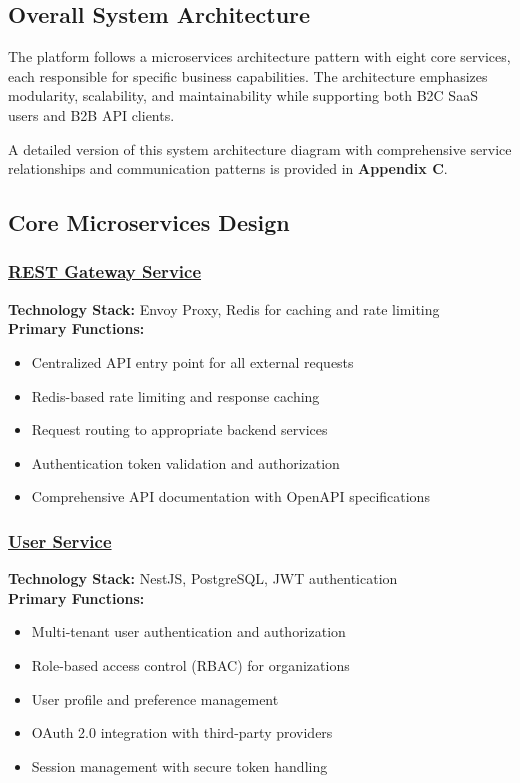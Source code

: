 \subsection{Overall System Architecture}
The platform follows a microservices architecture pattern with eight core services, each responsible for specific business capabilities. The architecture emphasizes modularity, scalability, and maintainability while supporting both B2C SaaS users and B2B API clients.

A detailed version of this system architecture diagram with comprehensive service relationships and communication patterns is provided in \textbf{Appendix C}.

\subsection{Core Microservices Design}

\subsubsection*{\underline{REST Gateway Service}}
\textbf{Technology Stack:} Envoy Proxy, Redis for caching and rate limiting\\
\textbf{Primary Functions:}
\begin{itemize}
    \item Centralized API entry point for all external requests
    \item Redis-based rate limiting and response caching
    \item Request routing to appropriate backend services
    \item Authentication token validation and authorization
    \item Comprehensive API documentation with OpenAPI specifications
\end{itemize}

\subsubsection*{\underline{User Service}}
\textbf{Technology Stack:} NestJS, PostgreSQL, JWT authentication\\
\textbf{Primary Functions:}
\begin{itemize}
    \item Multi-tenant user authentication and authorization
    \item Role-based access control (RBAC) for organizations
    \item User profile and preference management
    \item OAuth 2.0 integration with third-party providers
    \item Session management with secure token handling
\end{itemize}

